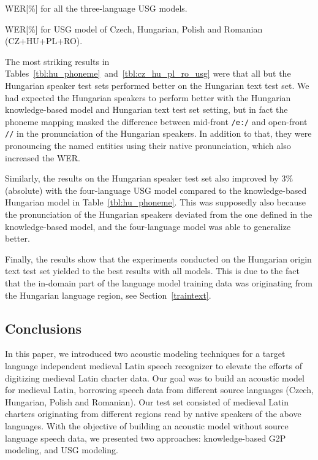 \documentclass[runningheads,a4paper]{llncs}
\begin{document}
\begin{table}
\parbox{.45\linewidth}{
\centering
\caption{WER[\%] for all the three-language USG models.}
\label{tbl:three_language_usg}
}
\hfill
\parbox{.45\linewidth}{
\centering
\caption{WER[\%] for USG model of Czech, Hungarian, Polish and Romanian (CZ+HU+PL+RO).}
\label{tbl:cz_hu_pl_ro_usg}
}
\end{table}
The most striking results in Tables~\ref{tbl:hu_phoneme}~and~\ref{tbl:cz_hu_pl_ro_usg} were that all but the Hungarian speaker test sets performed better on the Hungarian text test set.
We had expected the Hungarian speakers to perform better with the Hungarian knowledge-based model and Hungarian text test set setting, but in fact the phoneme mapping masked the difference between mid-front \texttt{/e:/} and open-front \texttt{//} in the pronunciation of the Hungarian speakers.
In addition to that, they were pronouncing the named entities using their native pronunciation, which also increased the WER.

Similarly, the results on the Hungarian speaker test set also improved by $3\%$ (absolute) with the four-language USG model compared to the knowledge-based Hungarian model in Table~\ref{tbl:hu_phoneme}.
This was supposedly also because the pronunciation of the Hungarian speakers deviated from the one defined in the knowledge-based model, and the four-language model was able to generalize better. 

Finally, the results show that the experiments conducted on the Hungarian origin text test set yielded to the best results with all models.
This is due to the fact that the in-domain part of the language model training data was originating from the Hungarian language region, see Section~\ref{traintext}.
\subsection{Conclusions}
In this paper, we introduced two acoustic modeling techniques for a target language independent medieval Latin speech recognizer to elevate the efforts of digitizing medieval Latin charter data.
Our goal was to build an acoustic model for medieval Latin, borrowing speech data from different source languages (Czech, Hungarian, Polish and Romanian).
Our test set consisted of medieval Latin charters originating from different regions read by native speakers of the above languages.
With the objective of building an acoustic model without source language speech data, we presented two approaches: knowledge-based G2P modeling, and USG modeling.
\end{document}
